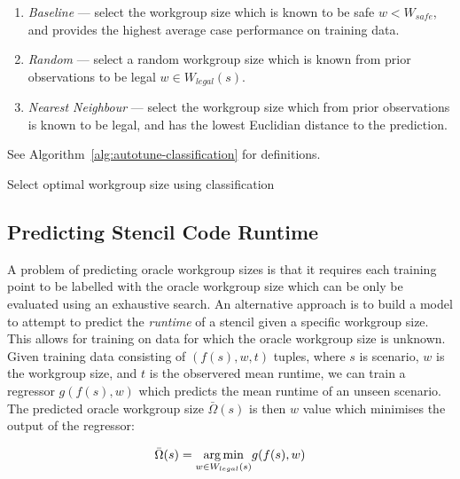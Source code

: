 \begin{enumerate}
\item \emph{Baseline} --- select the workgroup size which is known to
  be safe $w < W_{safe}$, and provides the highest average case
  performance on training data.
\item \emph{Random} --- select a random workgroup size which is known
  from prior observations to be legal $w \in W_{legal}(s)$.
\item \emph{Nearest Neighbour} --- select the workgroup size which
  from prior observations is known to be legal, and has the lowest
  Euclidian distance to the prediction.
\end{enumerate}

See Algorithm~\ref{alg:autotune-classification} for definitions.

\begin{algorithm}

\caption{Select optimal workgroup size using classification}
\label{alg:autotune-classification}
\end{algorithm}

% 


\subsection{Predicting Stencil Code Runtime}

A problem of predicting oracle workgroup sizes is that it requires
each training point to be labelled with the oracle workgroup size
which can be only be evaluated using an exhaustive search. An
alternative approach is to build a model to attempt to predict the
\emph{runtime} of a stencil given a specific workgroup size. This
allows for training on data for which the oracle workgroup size is
unknown. Given training data consisting of $(f(s),w,t)$ tuples, where
$s$ is scenario, $w$ is the workgroup size, and $t$ is the observered
mean runtime, we can train a regressor $g(f(s), w)$ which predicts the
mean runtime of an unseen scenario. The predicted oracle workgroup
size $\bar{\Omega}(s)$ is then $w$ value which minimises the output of
the regressor:

\begin{equation}
  \bar{\Omega}(s) = \underset{w \in W_{legal}(s)}{\operatorname*{arg\,min}} g(f(s), w)
\end{equation}

